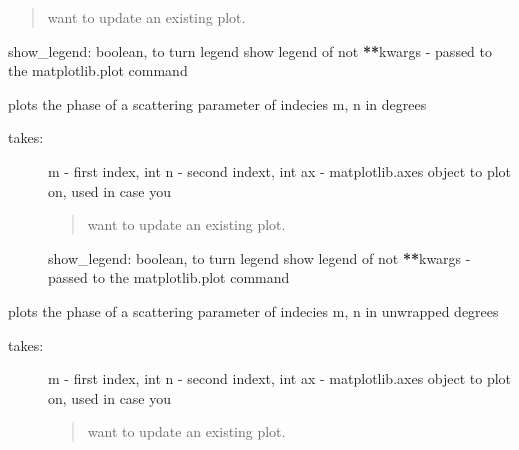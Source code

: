 \documentclass[letterpaper,10pt,english]{sphinxmanual}
\begin{document}
\begin{fulllineitems}
\begin{fulllineitems}
\begin{description}
\begin{quote}
want to update an existing plot.
\end{quote}

show\_legend: boolean, to turn legend show legend of not
{\color{red}\bfseries{}**}kwargs - passed to the matplotlib.plot command

\end{description}

\end{fulllineitems}


\begin{fulllineitems}
\label{auto_network:mwavepy.Network.plot_s_deg}
plots the phase of a scattering parameter of indecies m, n in
degrees
\begin{description}
\item[{takes:}] \leavevmode
m - first index, int
n - second indext, int
ax - matplotlib.axes object to plot on, used in case you
\begin{quote}

want to update an existing plot.
\end{quote}

show\_legend: boolean, to turn legend show legend of not
{\color{red}\bfseries{}**}kwargs - passed to the matplotlib.plot command

\end{description}

\end{fulllineitems}


\begin{fulllineitems}
\label{auto_network:mwavepy.Network.plot_s_deg_unwrapped}
plots the phase of a scattering parameter of indecies m, n in
unwrapped degrees
\begin{description}
\item[{takes:}] \leavevmode
m - first index, int
n - second indext, int
ax - matplotlib.axes object to plot on, used in case you
\begin{quote}

want to update an existing plot.
\end{quote}


\end{description}
\end{fulllineitems}
\end{fulllineitems}
\end{document}
